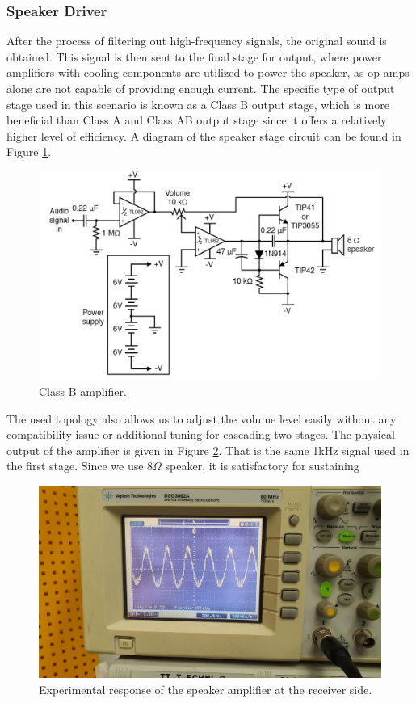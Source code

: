 \documentclass[a4paper,10pt]{IEEEtran}
\begin{document}
\subsubsection{Speaker Driver}
After the process of filtering out high-frequency signals, the original sound is obtained. This signal is then sent to the final stage for output, where power amplifiers with cooling components are utilized to power the speaker, as op-amps alone are not capable of providing enough current. The specific type of output stage used in this scenario is known as a Class B output stage, which is more beneficial than Class A and Class AB output stage since it offers a relatively higher level of efficiency. A diagram of the speaker stage circuit can be found in Figure \ref{classb}.
\begin{figure}[htbp!]
    \centering
    \includegraphics[width = 1\linewidth]{classb.png}
    \caption{Class B amplifier. }
    \label{classb}
\end{figure} 
The used topology also allows us to adjust the volume level easily without any compatibility issue or additional tuning for cascading two stages. The physical output of the amplifier is given in Figure \ref{speaker_osc}. That is the same 1kHz signal used in the first stage. Since we use 8\(\Omega\) speaker, it is satisfactory for sustaining 
\begin{figure}[htbp!]
    \centering
    \includegraphics[width = 1\linewidth]{speaker_amplifier.jpeg}
    \caption{Experimental response of the speaker amplifier at the receiver side. }
    \label{speaker_osc}
\end{figure} 
\end{document}
